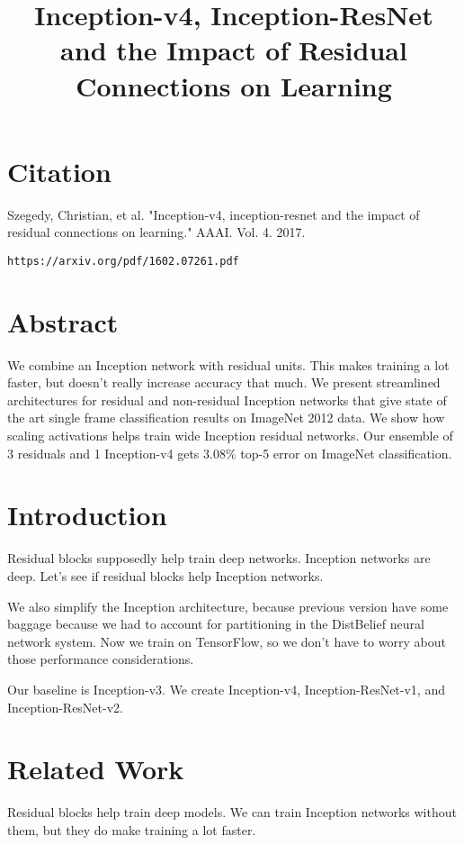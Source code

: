\documentclass[a4paper]{article}
\title{Inception-v4, Inception-ResNet and the Impact of Residual Connections on
Learning}
\date{}
\begin{document}
\maketitle

\section{Citation}
Szegedy, Christian, et al. "Inception-v4, inception-resnet and the impact of residual connections on learning." AAAI. Vol. 4. 2017.

\begin{verbatim}
https://arxiv.org/pdf/1602.07261.pdf
\end{verbatim}

\section{Abstract}
We combine an Inception network with residual units. This makes training a lot
faster, but doesn't really increase accuracy that much. We present streamlined
architectures for residual and non-residual Inception networks that give
state of the art single frame classification results on ImageNet 2012 data. We
show how scaling activations helps train wide Inception residual networks. Our
ensemble of 3 residuals and 1 Inception-v4 gets 3.08\% top-5 error on ImageNet
classification.

\section{Introduction}
Residual blocks supposedly help train deep networks. Inception networks are
deep. Let's see if residual blocks help Inception networks.

We also simplify the Inception architecture, because previous version have
some baggage because we had to account for partitioning in the DistBelief
neural network system. Now we train on TensorFlow, so we don't have to worry
about those performance considerations.

Our baseline is Inception-v3. We create Inception-v4, Inception-ResNet-v1,
and Inception-ResNet-v2.

\section{Related Work}
Residual blocks help train deep models. We can train Inception networks without
them, but they do make training a lot faster.
\end{document}
